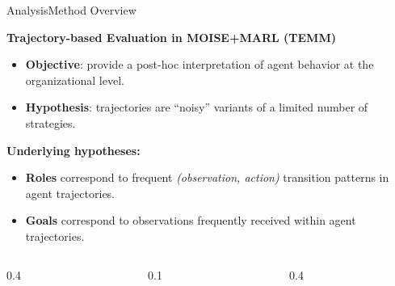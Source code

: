 \documentclass[aspectratio=169]{beamer}
\begin{document}
\begin{frame}{Analysis}{Method Overview}

  \footnotesize

  \textbf{Trajectory-based Evaluation in MOISE+MARL (TEMM)}
  \begin{itemize}
    \item \textbf{Objective}: provide a post-hoc interpretation of agent behavior at the organizational level.
    \item \textbf{Hypothesis}: trajectories are ``noisy'' variants of a limited number of strategies.

  \end{itemize}

  \vspace{0em}
  \textbf{Underlying hypotheses:}
  \begin{itemize}
    \item \textbf{Roles} correspond to frequent \emph{(observation, action)} transition patterns in agent trajectories.
    \item \textbf{Goals} correspond to observations frequently received within agent trajectories.
  \end{itemize}

  \vspace{0.1cm}
  \begin{center}
    \begin{columns}[c]

      \begin{column}{0.4\textwidth}
        \centering
        
      \end{column}

      \begin{column}{0.1\textwidth}
      \end{column}

      \begin{column}{0.4\textwidth}
        \centering
        
      \end{column}
    \end{columns}
  \end{center}

\end{frame}
\end{document}
